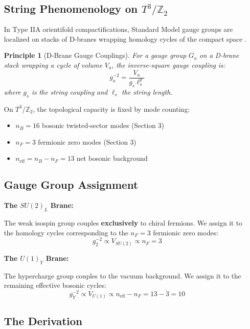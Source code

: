 \documentclass[12pt,a4paper]{article}
\newtheorem{principle}[theorem]{Principle}
\newcommand{\Ztwo}{\mathbb{Z}_2}
\newcommand{\Tthree}{T^3}
\newcommand{\nB}{n_B}
\newcommand{\nF}{n_F}
\begin{document}
\subsection{String Phenomenology on $\Tthree/\Ztwo$}

In Type IIA orientifold compactifications, Standard Model gauge groups are localized on stacks of D-branes wrapping homology cycles of the compact space \cite{Ibanez}.

\begin{principle}[D-Brane Gauge Couplings]
For a gauge group $G_a$ on a D-brane stack wrapping a cycle of volume $V_a$, the inverse-square gauge coupling is:
\begin{equation}
g_a^{-2} = \frac{V_a}{g_s \ell_s^p}
\end{equation}
where $g_s$ is the string coupling and $\ell_s$ the string length.
\end{principle}

On $\Tthree/\Ztwo$, the topological capacity is fixed by mode counting:
\begin{itemize}
    \item $\nB = 16$ bosonic twisted-sector modes (Section 3)
    \item $\nF = 3$ fermionic zero modes (Section 3)
    \item $n_{\text{eff}} = \nB - \nF = 13$ net bosonic background
\end{itemize}

\subsection{Gauge Group Assignment}

\textbf{The $SU(2)_L$ Brane:}

The weak isospin group couples \textbf{exclusively} to chiral fermions. We assign it to the homology cycles corresponding to the $\nF = 3$ fermionic zero modes:
\begin{equation}
g_2^{-2} \propto V_{SU(2)} \propto \nF = 3
\end{equation}

\textbf{The $U(1)_Y$ Brane:}

The hypercharge group couples to the vacuum background. We assign it to the remaining effective bosonic cycles:
\begin{equation}
g_Y^{-2} \propto V_{U(1)} \propto n_{\text{eff}} - \nF = 13 - 3 = 10
\end{equation}

\subsection{The Derivation}
\end{document}
